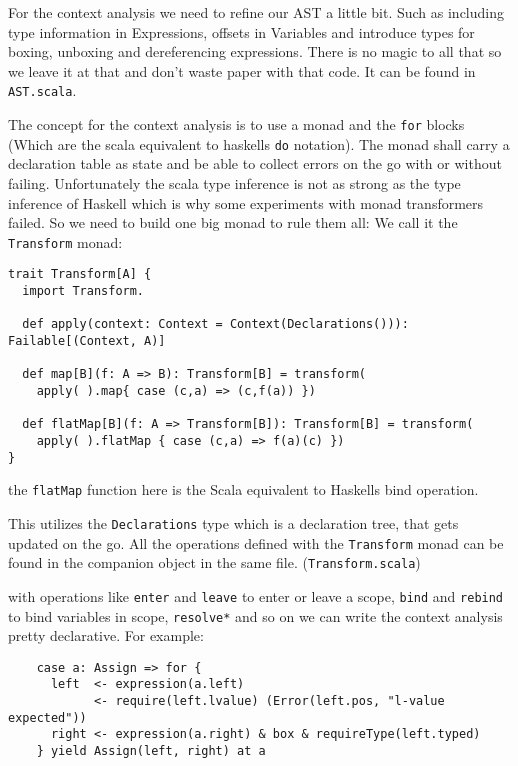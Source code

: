 \documentclass{style}
\begin{document}
For the context analysis we need to refine our AST a little bit. Such as including type information in Expressions, offsets in Variables and introduce types for boxing, unboxing and dereferencing expressions. There is no magic to all that so we leave it at that and don't waste paper with that code. It can be found in \texttt{AST.scala}.

The concept for the context analysis is to use a monad and the \texttt{for} blocks (Which are the scala equivalent to haskells \texttt{do} notation). The monad shall carry a declaration table as state and be able to collect errors on the go with or without failing. Unfortunately the scala type inference is not as strong as the type inference of Haskell which is why some experiments with monad transformers failed. So we need to build one big monad to rule them all: We call it the \texttt{Transform} monad:

\begin{lstlisting}
trait Transform[A] {
  import Transform.

  def apply(context: Context = Context(Declarations())): Failable[(Context, A)]

  def map[B](f: A => B): Transform[B] = transform(
    apply( ).map{ case (c,a) => (c,f(a)) })

  def flatMap[B](f: A => Transform[B]): Transform[B] = transform(
    apply( ).flatMap { case (c,a) => f(a)(c) })
}
\end{lstlisting}

the \texttt{flatMap} function here is the Scala equivalent to Haskells bind operation.

This utilizes the \texttt{Declarations} type which is a declaration tree, that gets updated on the go. All the operations defined with the \texttt{Transform} monad can be found in the companion object in the same file. (\texttt{Transform.scala})

with operations like \texttt{enter} and \texttt{leave} to enter or leave a scope, \texttt{bind} and \texttt{rebind} to bind variables in scope, \texttt{resolve*} and so on we can write the context analysis pretty declarative. For example:

\begin{lstlisting}
    case a: Assign => for {
      left  <- expression(a.left)
            <- require(left.lvalue) (Error(left.pos, "l-value expected"))
      right <- expression(a.right) & box & requireType(left.typed)
    } yield Assign(left, right) at a    
\end{lstlisting}
\end{document}
